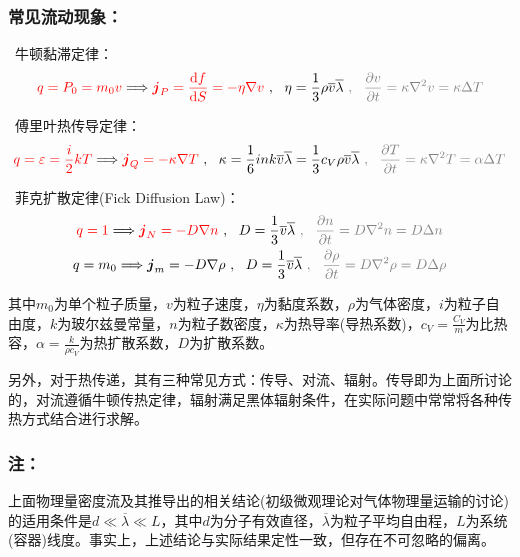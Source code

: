 \documentclass[zihao=5,UTF8]{report}
\begin{document}
\subsubsection{常见流动现象：}
\ 牛顿黏滞定律：
\begin{equation}
    {\color{red}q = P_0 = m_0v} \Longrightarrow \textcolor{red}{\boldsymbol{j}_P = \frac{\mathrm{d}f}{\mathrm{d}S} = - \eta \nabla v }\ ,\ \  \eta = \frac{1}{3}\rho \overline{v}\overline{\lambda} \textcolor{gray}{\ , \ \ \frac{\partial v}{\partial t} =\kappa \nabla^2 v =\kappa \Delta T}
\end{equation}\par
{}\ 傅里叶热传导定律：
\begin{equation}
    {\color{red}q = \varepsilon = \frac{i}{2}kT} \Longrightarrow \textcolor{red}{\boldsymbol{j}_Q = -\kappa \nabla T }\ ,\ \ \kappa = \frac{1}{6}ink\overline{v}\overline{\lambda} = \frac{1}{3}c_V\rho \overline{v} \overline{\lambda} \textcolor{gray}{\ , \ \ \frac{\partial T}{\partial t} =\kappa \nabla^2 T =\alpha \Delta T}
\end{equation}\par
{}\ 菲克扩散定律(Fick Diffusion Law)：
\begin{gather}
    {\color{red}q = 1} \Longrightarrow \textcolor{red}{\boldsymbol{j}_N = -D\nabla n}\ ,\ \ D = \frac{1}{3}\overline{v}\overline{\lambda} \textcolor{gray}{\ , \ \ \frac{\partial n}{\partial t} =D \nabla^2 n =D\Delta n}\\ 
    q = m_0 \Longrightarrow \boldsymbol{j}_m = -D\nabla \rho\ ,\ \ D = \frac{1}{3}\overline{v}\overline{\lambda}\textcolor{gray}{\ , \ \ \frac{\partial \rho}{\partial t} =D \nabla^2 \rho=D\Delta \rho}
\end{gather}\par
{\color{gray}\small 其中$m_0$为单个粒子质量，$v$为粒子速度，$\eta$为黏度系数，$\rho$为气体密度，$i$为粒子自由度，$k$为玻尔兹曼常量，$n$为粒子数密度，$\kappa$为热导率(导热系数)，$c_V = \frac{C_V}{m}$为比热容，$\alpha = \frac{k}{\rho c_V}$为热扩散系数，$D$为扩散系数。\par
另外，对于热传递，其有三种常见方式：传导、对流、辐射。传导即为上面所讨论的，对流遵循牛顿传热定律，辐射满足黑体辐射条件，在实际问题中常常将各种传热方式结合进行求解。}\par

\subsubsection{注：}上面物理量密度流及其推导出的相关结论(初级微观理论对气体物理量运输的讨论)的适用条件是$d \ll \overline{\lambda}\ll L$，其中$d$为分子有效直径，$\overline{\lambda}$为粒子平均自由程，$L$为系统(容器)线度。事实上，上述结论与实际结果定性一致，但存在不可忽略的偏离。
\end{document}
